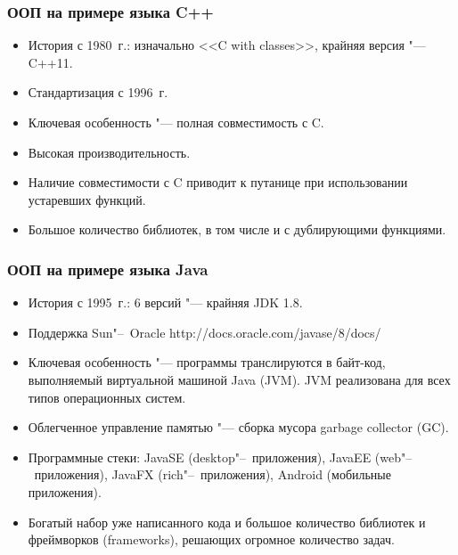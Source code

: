 \documentclass[default]{beamer}
\begin{document}
	\begin{frame}
		\frametitle{ООП на примере языка C++}
		
		\begin{itemize}
			\item История с 1980~г.: изначально <<C with classes>>, крайняя версия "---
			C++11.
			\item Стандартизация с 1996~г. 
			\item Ключевая особенность "--- полная совместимость с C.
			\item Высокая производительность.
			\item Наличие совместимости с C приводит к путанице при использовании
			устаревших функций.
			\item Большое количество библиотек, в том числе и с дублирующими функциями.
		\end{itemize}		
	
	\end{frame}
	
	\begin{frame}
		\frametitle{ООП на примере языка Java}
		
		\begin{itemize}
			\item История с 1995~г.: 6 версий "--- крайняя JDK 1.8.
			\item Поддержка Sun"--~Oracle http://docs.oracle.com/javase/8/docs/
			\item Ключевая особенность "--- программы транслируются в байт-код,
			выполняемый виртуальной машиной Java (JVM). JVM реализована для всех типов
			операционных систем.
			\item Облегченное управление памятью "--- сборка мусора garbage collector
			(GC).
			\item Программные стеки: JavaSE (desktop"--~приложения), JavaEE
			(web"--~приложения), JavaFX (rich"--~приложения), Android (мобильные
			приложения).
			\item Богатый набор уже написанного кода и большое количество библиотек и
			фреймворков (frameworks), решающих огромное количество задач.
		\end{itemize}
	\end{frame}
	
\end{document}

